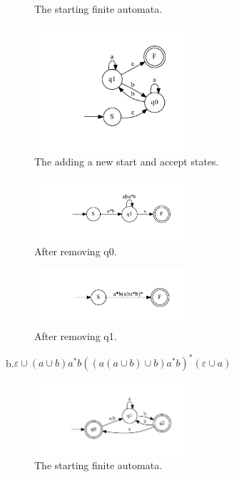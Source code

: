 \documentclass[10pt] {article}
\begin{document}
\begin{enumerate}
\begin{figure}[H]
\caption{The starting finite automata.}
\label{22}
\end{figure}
\begin{figure}[H]
\includegraphics[width=0.5\textwidth]{ab21.pdf}
\caption{The adding a new start and accept states.}
\label{23}
\end{figure}
\begin{figure}[H]
\includegraphics[width=0.5\textwidth]{ac21.pdf}
\caption{After removing q0.}
\label{24}
\end{figure}
\begin{figure}[H]
\includegraphics[width=0.5\textwidth]{ad21.pdf}
\caption{After removing q1.}
\label{25}
\end{figure}
b.$\varepsilon \cup(a \cup b)a^* b ((a(a \cup b) \cup b)a^* b )^* (\varepsilon \cup a)$
\begin{figure}[H]
\includegraphics[width=0.5\textwidth]{bba21.pdf}
\caption{The starting finite automata.}
\label{26}
\end{figure}
\begin{figure}[H]

\end{figure}
\end{enumerate}
\end{document}
